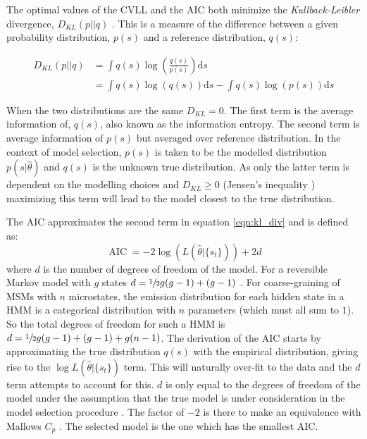 The optimal values of the CVLL and the AIC both minimize the \emph{Kullback-Leibler} divergence, $D_{KL}(p||q)$ \cite{mclachlanFiniteMixtureModels2000}. This is a measure of the difference between a given probability distribution, $p(s)$ and a reference distribution, $q(s)$: 

\begin{equation}\label{eqn:kl_div}
\begin{split}
    D_{KL}\left(p||q\right) & = \int q(s) \log{\left(\frac{ q(s) }{p(s)}  \right)} \mathrm{d}s \\ 
    & = \int q(s) \log{\left(q(s)\right)}\mathrm{d}s - \int q(s)\log{\left(p(s)\right)} \mathrm{d}s
\end{split}
\end{equation}

When the two distributions are the same $D_{KL} = 0$. The first term is the average information of, $q(s)$, also known as the information entropy\cite{mackay2003information}. The second term is average information of $p(s)$ but averaged over reference distribution. In the context of model selection, $p(s)$ is taken to be the modelled distribution $p(s|\hat{\theta})$ and $q(s)$ is the unknown true distribution. As only the latter term is dependent on the modelling choices and  $D_{KL}\ge 0$ (Jensen's inequality \cite{mackay2003information}) maximizing this term will lead to the model closest to the true distribution.  

The AIC approximates the second term in equation \ref{eqn:kl_div} and is defined as\cite{mclachlanFiniteMixtureModels2000}:
\begin{equation}\label{eqn:aic}
    \operatorname{AIC} = -2\log{\left(L\left(\hat{\theta}|\{s_t\}\right)\right)} + 2d
\end{equation}
where $d$ is the number of degrees of freedom of the model. For a reversible Markov model with $g$ states $d = \sfrac{1}{2}g(g-1) + (g-1)$ \cite{trendelkamp-schroerEstimationUncertaintyReversible2015b}. For coarse-graining of MSMs with $n$ microstates, the emission distribution for each hidden state in a HMM is a categorical distribution with $n$ parameters (which must all sum to $1$). So the total  degrees of freedom for such a HMM is $d = \sfrac{1}{2}g(g-1) + (g-1) + g(n-1)$. The derivation of the AIC starts by approximating the true distribution $q(s)$ with the empirical distribution, giving rise to the $\log{L\left(\hat{\theta}|\{s_t\} \right)}$ term.  This will naturally over-fit to the data and the $d$ term attempts to account for this. $d$ is only equal to the degrees of freedom of the model under the assumption that the true model is under consideration in the model selection procedure \cite{ripley_1996}.  The factor of $-2$ is there to make an equivalence with Mallows $C_p$ \cite{friedman2001elements}. The selected model is the one which has the smallest AIC. 

